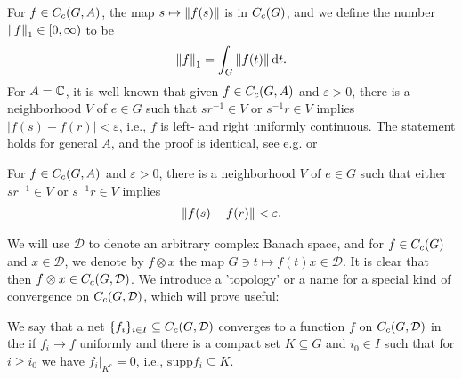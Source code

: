 For $f \in C_c(G,A)$, the map $s \mapsto \left\lVert f(s) \right\rVert$ is in $C_c(G)$, and we define the number $\left\lVert f \right\rVert_1 \in [0,\infty)$ to be
\begin{align*}
\left\lVert f \right\rVert_1 = \int_G \left\lVert f(t) \right\rVert \mathrm{d} t.
\end{align*}
For $A= \mathbb{C}$, it is well known that given $f \in C_c(G,A)$ and $\varepsilon > 0$, there is a neighborhood $V$ of $e \in G$ such that $sr^{-1} \in V$ or $s^{-1}r \in V$ implies $| f(s) - f(r)| < \varepsilon$, i.e., $f$ is left- and right uniformly continuous. The statement holds for general $A$, and the proof is identical, see e.g. \cite[Proposition 2.6]{folland2016fourier} or \cite[Lemma 1.88]{williamscrossed}
\begin{lemma}
For $f \in C_c(G,A)$ and $\varepsilon>0$, there is a neighborhood $V$ of $e \in G$ such that either $sr^{-1} \in V$ or $s^{-1}r \in V$ implies
\begin{align*}
	\left\lVert f(s)  - f(r) \right\rVert < \varepsilon.
\end{align*}
\label{int:lrunicont}
\end{lemma}

We will use $\mathcal{D}$ to denote an arbitrary complex Banach space, and for $f \in C_c(G)$ and $x \in \mathcal{D}$, we denote by $f \otimes x$ the map $G \ni t \mapsto f(t)x \in \mathcal{D}$. It is clear that then $f \otimes x \in C_c(G,\mathcal{D})$. We introduce a 'topology' or a name for a special kind of convergence on $C_c(G,\mathcal{D})$, which will prove useful:
\begin{definition}
We say that a net $\{f_i\}_{i \in I} \subseteq C_c(G,\mathcal{D})$ converges to a function $f$ on $C_c(G,\mathcal{D})$ in the  if $f_i \to f$ uniformly and there is a compact set $K \subseteq G$ and $i_0 \in I$ such that for $i \geq i_0$ we have $f_i \big|_{K^c} = 0$, i.e., $\mathrm{supp} f_i \subseteq K$.
\end{definition}

